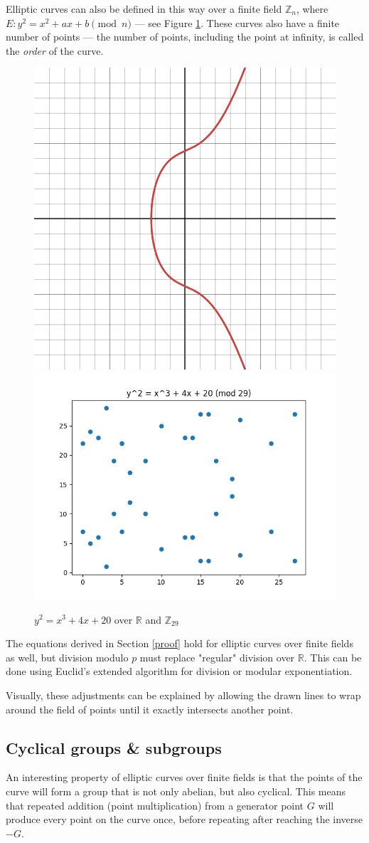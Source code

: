 \documentclass[a4paper]{article}
\begin{document}
Elliptic curves can also be defined in this way over a finite field $\mathbb{Z}_n$, where $E: y^2 = x^2 + ax + b \pmod n$ --- see Figure \ref{fig:finite}. These curves also have a finite number of points --- the number of points, including the point at infinity, is called the \textit{order} of the curve.\cite{guide}

\begin{figure}[h]
    \centering
    \includegraphics[width=0.3\linewidth]{images/finite-graph.png}
    \includegraphics[width=0.4\linewidth]{images/finite-plt.png}
    \caption{$y^2=x^3+4x+20$ over $\mathbb{R}$ and $\mathbb{Z}_{29}$}
    \label{fig:finite}
\end{figure}

The equations derived in Section \ref{proof} hold for elliptic curves over finite fields as well, but division modulo $p$ must replace "regular" division over $\mathbb{R}$. This can be done using Euclid's extended algorithm for division\cite{discrete} or modular exponentiation.

Visually, these adjustments can be explained by allowing the drawn lines to wrap around the field of points until it exactly intersects another point. %

\subsection{Cyclical groups \& subgroups}

An interesting property of elliptic curves over finite fields is that the points of the curve will form a group that is not only abelian, but also cyclical. This means that repeated addition (point multiplication) from a generator point $G$ will produce every point on the curve once, before repeating after reaching the inverse $-G$.
\end{document}
